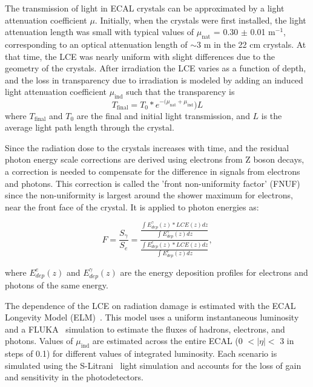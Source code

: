 The transmission of light in ECAL crystals can be approximated by a light attenuation coefficient $\mu$. Initially, when the crystals were first installed, the light attenuation length was small with typical values of $\mu_{\mathrm{nat}}$ = 0.30 $\pm$ 0.01 m$^{-1}$, corresponding to an optical attenuation length of $\sim$3 m in the 22 cm crystals. At that time, the LCE was nearly uniform with slight differences due to the geometry of the crystals. After irradiation the LCE varies as a function of depth, and the loss in transparency due to irradiation is modeled by adding an induced light attenuation coefficient $\mu_{\mathrm{ind}}$ such that the transparency is
\begin{equation}
    T_{\mathrm{final}} = T_0 * e^{-(\mu_{\mathrm{nat}} + \mu_{\mathrm{ind}}}) L
\end{equation}
where $T_{\mathrm{final}}$ and $T_0$ are the final and initial light transmission, and $L$ is the average light path length through the crystal.

Since the radiation dose to the crystals increases with time, and the residual photon energy scale corrections are derived using electrons from Z boson decays, a correction is needed to compensate for the difference in signals from electrons and photons. This correction is called the 'front non-uniformity factor' (FNUF) since the non-uniformity is largest around the shower maximum for electrons, near the front face of the crystal. It is applied to photon energies as:

\begin{equation}
    F = \frac{S_{\gamma}}{S_e} = \frac{\frac{\int E^{\gamma}_{dep}(z) * LCE(z) dz}{\int E^{\gamma}_{dep}(z) dz}}{\frac{\int E^{e}_{dep}(z) * LCE(z) dz}{\int E^{e}_{dep}(z) dz}},
    \label{eqn:fnuf}
\end{equation}

\noindent where $E^{e}_{dep}(z)$ and $E^{\gamma}_{dep}(z)$ are the energy deposition profiles for electrons and photons of the same energy. 

The dependence of the LCE on radiation damage is estimated with the ECAL Longevity Model (ELM)~\cite{FNUF1}. This model uses a uniform instantaneous luminosity and a FLUKA~\cite{FLUKA} simulation to estimate the fluxes of hadrons, electrons, and photons. Values of $\mu_{\mathrm{ind}}$ are estimated across the entire ECAL (0 $< |\eta| <$ 3 in steps of 0.1) for different values of integrated luminosity. Each scenario is simulated using the S-Litrani~\cite{Gentit200235} light simulation and accounts for the loss of gain and sensitivity in the photodetectors. 

